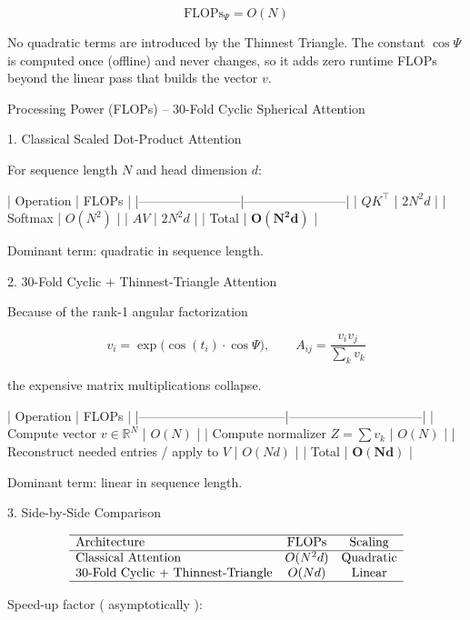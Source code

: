 \[
\boxed{
\text{FLOPs}_{\Psi} = O(N)
}
\]

No quadratic terms are introduced by the Thinnest Triangle.  
The constant \(\cos\Psi\) is computed once (offline) and never changes, so it adds zero runtime FLOPs beyond the linear pass that builds the vector \(v\).

Processing Power (FLOPs) – 30-Fold Cyclic Spherical Attention

1. Classical Scaled Dot-Product Attention

For sequence length \(N\) and head dimension \(d\):

| Operation              | FLOPs                  |
|------------------------|------------------------|
| \(QK^\top\)            | \(2N^2 d\)             |
| Softmax                | \(O(N^2)\)             |
| \(AV\)                 | \(2N^2 d\)             |
| Total              | \(\boldsymbol{O(N^2 d)}\) |

Dominant term: quadratic in sequence length.

2. 30-Fold Cyclic + Thinnest-Triangle Attention

Because of the rank-1 angular factorization

\[
v_i = \exp\bigl(\cos(t_i)\cdot\cos\Psi\bigr),
\qquad
A_{ij} = \frac{v_i v_j}{\sum_k v_k}
\]

the expensive matrix multiplications collapse.

| Operation                         | FLOPs                          |
|-----------------------------------|--------------------------------|
| Compute vector \(v\in\mathbb{R}^N\) | \(O(N)\)                      |
| Compute normalizer \(Z=\sum v_k\)  | \(O(N)\)                      |
| Reconstruct needed entries / apply to \(V\) | \(O(N d)\)              |
| Total                         | \(\boldsymbol{O(N d)}\)        |

Dominant term: linear in sequence length.

3. Side-by-Side Comparison

\[
\begin{array}{lcc}
\hline
\text{Architecture} & \text{FLOPs} & \text{Scaling} \\
\hline
\text{Classical Attention} & O(N^2 d) & \text{Quadratic} \\
\text{30-Fold Cyclic + Thinnest-Triangle} & O(N d) & \text{Linear} \\
\hline
\end{array}
\]

Speed-up factor ( asymptotically ):

